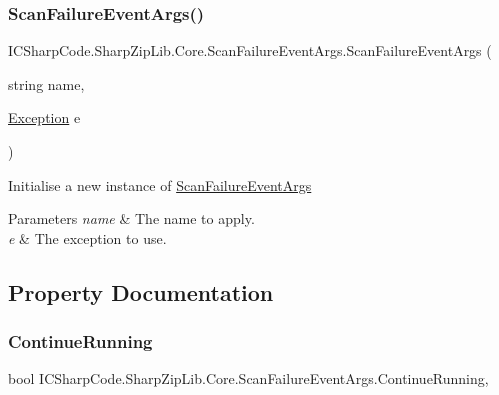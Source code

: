 \subsubsection{\texorpdfstring{Scan\+Failure\+Event\+Args()}{ScanFailureEventArgs()}}
{\footnotesize\ttfamily I\+C\+Sharp\+Code.\+Sharp\+Zip\+Lib.\+Core.\+Scan\+Failure\+Event\+Args.\+Scan\+Failure\+Event\+Args (\begin{DoxyParamCaption}\item[{string}]{name,  }\item[{\hyperlink{class_i_c_sharp_code_1_1_sharp_zip_lib_1_1_core_1_1_scan_failure_event_args_ae0d02d556095208f78a4c1644f3aa15d}{Exception}}]{e }\end{DoxyParamCaption})\hspace{0.3cm}{\ttfamily [inline]}}



Initialise a new instance of \hyperlink{class_i_c_sharp_code_1_1_sharp_zip_lib_1_1_core_1_1_scan_failure_event_args}{Scan\+Failure\+Event\+Args} 


\begin{DoxyParams}{Parameters}
{\em name} & The name to apply.\\
\hline
{\em e} & The exception to use.\\
\hline
\end{DoxyParams}


\subsection{Property Documentation}
\mbox{\label{class_i_c_sharp_code_1_1_sharp_zip_lib_1_1_core_1_1_scan_failure_event_args_a33ff555d14337a99859499c4f33a93d6}} 
\subsubsection{\texorpdfstring{Continue\+Running}{ContinueRunning}}
{\footnotesize\ttfamily bool I\+C\+Sharp\+Code.\+Sharp\+Zip\+Lib.\+Core.\+Scan\+Failure\+Event\+Args.\+Continue\+Running\hspace{0.3cm}{\ttfamily [get]}, {\ttfamily [set]}}



